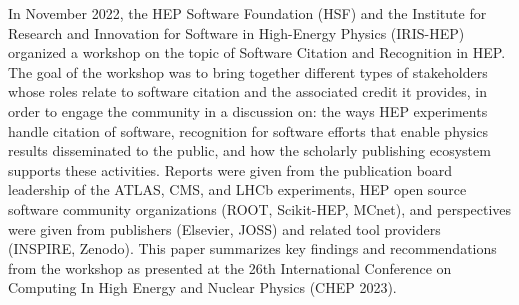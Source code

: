 In November 2022, the HEP Software Foundation (HSF) and the Institute for Research and Innovation for Software in High-Energy Physics (IRIS-HEP) organized a workshop on the topic of Software Citation and Recognition in HEP.
The goal of the workshop was to bring together different types of stakeholders whose roles relate to software citation and the associated credit it provides, in order to engage the community in a discussion on: the ways HEP experiments handle citation of software, recognition for software efforts that enable physics results disseminated to the public, and how the scholarly publishing ecosystem supports these activities.
Reports were given from the publication board leadership of the ATLAS, CMS, and LHCb experiments, HEP open source software community organizations (ROOT, Scikit-HEP, MCnet), and perspectives were given from publishers (Elsevier, JOSS) and related tool providers (INSPIRE, Zenodo).
This paper summarizes key findings and recommendations from the workshop as presented at the 26th International Conference on Computing In High Energy and Nuclear Physics (CHEP 2023).
